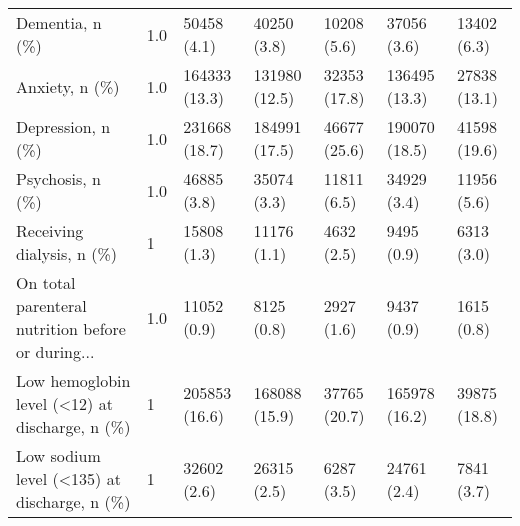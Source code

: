\begin{tabular}{L{20em}C{10em}C{10em}C{10em}C{10em}C{10em}}
                                   Dementia, n (\%) &                                 \hspace{3mm} 1.0 &        50458 (4.1) &                             40250 (3.8) &                         10208 (5.6) &                              37056 (3.6) &                         13402 (6.3) \\
                                    Anxiety, n (\%) &                                 \hspace{3mm} 1.0 &      164333 (13.3) &                           131980 (12.5) &                        32353 (17.8) &                            136495 (13.3) &                        27838 (13.1) \\
                                 Depression, n (\%) &                                 \hspace{3mm} 1.0 &      231668 (18.7) &                           184991 (17.5) &                        46677 (25.6) &                            190070 (18.5) &                        41598 (19.6) \\
                                  Psychosis, n (\%) &                                 \hspace{3mm} 1.0 &        46885 (3.8) &                             35074 (3.3) &                         11811 (6.5) &                              34929 (3.4) &                         11956 (5.6) \\
                         Receiving dialysis, n (\%) &                                   \hspace{3mm} 1 &        15808 (1.3) &                             11176 (1.1) &                          4632 (2.5) &                               9495 (0.9) &                          6313 (3.0) \\
 On total parenteral nutrition before or during... &                                 \hspace{3mm} 1.0 &        11052 (0.9) &                              8125 (0.8) &                          2927 (1.6) &                               9437 (0.9) &                          1615 (0.8) \\
    Low hemoglobin level (<12) at discharge, n (\%) &                                   \hspace{3mm} 1 &      205853 (16.6) &                           168088 (15.9) &                        37765 (20.7) &                            165978 (16.2) &                        39875 (18.8) \\
       Low sodium level (<135) at discharge, n (\%) &                                   \hspace{3mm} 1 &        32602 (2.6) &                             26315 (2.5) &                          6287 (3.5) &                              24761 (2.4) &                          7841 (3.7) \\

\end{tabular}
